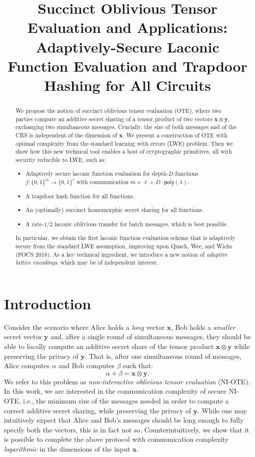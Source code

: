 \documentclass{theoretics}
\title{Succinct Oblivious Tensor Evaluation and Applications: Adaptively-Secure Laconic Function Evaluation and Trapdoor Hashing for All Circuits}
\newcommand{\poly}{\mathsf{poly}}
\renewcommand{\sec}{\ensuremath{\lambda}}
\begin{document}
\maketitle
\begin{abstract}
    We propose the notion of succinct oblivious tensor evaluation (OTE), where two parties compute an additive secret sharing of a tensor product of two vectors $\mathbf{x} \otimes \mathbf{y}$, exchanging two simultaneous messages. Crucially, the size of both messages and of the CRS is independent of the dimension of $\mathbf{x}$.
    We present a construction of OTE with optimal complexity from the standard learning with errors (LWE) problem. Then we show how this new technical tool enables a host of cryptographic primitives, all with security reducible to LWE, such as:
    \begin{itemize}
        \item Adaptively secure laconic function evaluation for depth-$D$ functions $f:\{0, 1\}^m\rightarrow\{0, 1\}^\ell$ with communication $m+\ell+ D\cdot\poly(\sec)$.
        \item A trapdoor hash function for all functions.
        \item An (optimally) succinct homomorphic secret sharing for all functions.
        \item A rate-$1/2$ laconic oblivious transfer for batch messages, which is best possible.
    \end{itemize}
    In particular, we obtain the first laconic function evaluation scheme that is adaptively secure from the standard LWE assumption, improving upon Quach, Wee, and Wichs (FOCS 2018). 
    As a key technical ingredient, we introduce a new notion of \emph{adaptive lattice encodings}, which may be of independent interest.
\end{abstract}

 


\section{Introduction}


Consider the scenario where Alice holds a \emph{long} vector $\mathbf{x}$, Bob holds a \emph{smaller} secret vector $\mathbf{y}$ and, after a single round of simultaneous messages, they should be able to locally compute an additive secret share of the tensor product $\mathbf{x} \otimes \mathbf{y}$ while preserving the privacy of $\mathbf{y}$. That is, after one simultaneous round of messages, Alice computes $\alpha$ and Bob computes $\beta$ such that:
\[
\alpha + \beta = \mathbf{x}\otimes \mathbf{y}.
\]
We refer to this problem as \emph{non-interactive oblivious tensor evaluation} (NI-OTE). In this work, we are interested in the communication complexity of secure NI-OTE, i.e., the minimum size of the messages needed in order to compute a correct additive secret sharing, while preserving the privacy of $\mathbf{y}$. While one may intuitively expect that Alice and Bob's messages should be long enough to fully specify both the vectors, this is in fact not so. Counterintuitively, we show that it is possible to complete the above protocol with communication complexity \emph{logarithmic} in the dimensions of the input $\mathbf{x}$.
\end{document}
